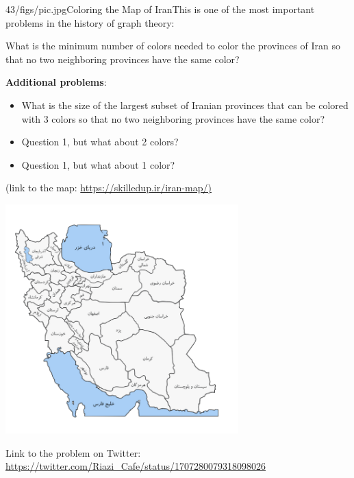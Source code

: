 \begin{problem}{43/figs/pic.jpg}{Coloring the Map of Iran}This is one of the most important problems in the history of graph theory:
	
What is the minimum number of colors needed to color the provinces of Iran so that no two neighboring provinces have the same color?

\textbf{Additional problems}:
\begin{itemize}
\item What is the size of the largest subset of Iranian provinces that can be colored with 3 colors so that no two neighboring provinces have the same color?
\item Question 1, but what about 2 colors?
\item Question 1, but what about 1 color?
\end{itemize}
(link to the map:  \url{https://skilledup.ir/iran-map/)}

\begin{center}
	\includegraphics[width=9cm]{43/figs/43_iran.png}
\end{center}

 Link to the problem on Twitter: \url{https://twitter.com/Riazi_Cafe/status/1707280079318098026}\end{problem}